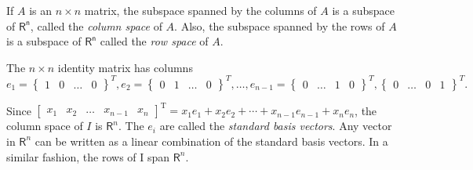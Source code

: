 \documentclass[../main.tex]{subfiles}
\begin{document}
\begin{definition}
	\label{defn:defn_3_3}
	If $A$ is an $n \times  n$ matrix, the subspace spanned by the columns of $A$ is a subspace of $\mathsf{R^n}$, called the \emph{column space} of $A$. Also, the subspace spanned by the rows of $A$ is a subspace of $\mathsf{R^n}$ called the \emph{row space} of $A$.
\end{definition}

\begin{example}  The $n \times  n$ identity matrix has columns
$$e_1 = \begin{Bmatrix} 1 & 0 & \ldots & 0 \end{Bmatrix}^{T}, e_2 = \begin{Bmatrix} 0 & 1 & \ldots & 0 \end{Bmatrix}^{T}, \ldots, e_{n-1} = \begin{Bmatrix} 0 & \ldots &1 & 0 \end{Bmatrix}^{T},  \begin{Bmatrix} 0 & \ldots & 0 & 1 \end{Bmatrix}^{T}. $$


Since $\left[\begin{array}{lllll}x_{1} & x_{2} & \ldots & x_{n-1} & x_{n}\end{array}\right]^{\mathrm{T}}=x_{1} e_{1}+x_{2} e_{2}+\cdots+x_{n-1} e_{n-1}+x_{n} e_{n}$, the column space of $I$ is $\mathsf{R}^{n} .$ The $e_{i}$ are called the
\emph{standard basis vectors}. Any vector in $\mathsf{R}^{n}$ can be written as a linear combination of the standard basis vectors. In a similar fashion, the rows of I span $\mathsf{R}^{n}$.
\end{example}
\end{document}
